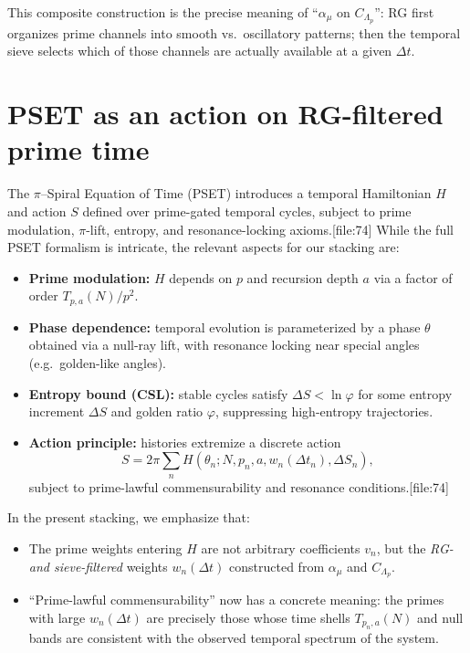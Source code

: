 \documentclass[11pt]{article}
\begin{document}
This composite construction is the precise meaning of ``$\alpha_\mu$ on $C_{\Lambda_p}$'': RG first organizes prime channels into smooth vs.\ oscillatory patterns; then the temporal sieve selects which of those channels are actually available at a given $\Delta t$.

\section{PSET as an action on RG-filtered prime time}

The $\pi$--Spiral Equation of Time (PSET) introduces a temporal Hamiltonian $H$ and action $S$ defined over prime-gated temporal cycles, subject to prime modulation, $\pi$-lift, entropy, and resonance-locking axioms.[file:74]
While the full PSET formalism is intricate, the relevant aspects for our stacking are:

\begin{itemize}
    \item \textbf{Prime modulation:} $H$ depends on $p$ and recursion depth $a$ via a factor of order $T_{p,a}(N) / p^2$.
    \item \textbf{Phase dependence:} temporal evolution is parameterized by a phase $\theta$ obtained via a null-ray lift, with resonance locking near special angles (e.g.\ golden-like angles).
    \item \textbf{Entropy bound (CSL):} stable cycles satisfy $\Delta S < \ln \varphi$ for some entropy increment $\Delta S$ and golden ratio $\varphi$, suppressing high-entropy trajectories.
    \item \textbf{Action principle:} histories extremize a discrete action
    \begin{equation}
        S = 2\pi \sum_n H(\theta_n; N, p_n, a, w_n(\Delta t_n), \Delta S_n),
    \end{equation}
    subject to prime-lawful commensurability and resonance conditions.[file:74]
\end{itemize}

In the present stacking, we emphasize that:
\begin{itemize}
    \item The prime weights entering $H$ are not arbitrary coefficients $v_n$, but the \emph{RG- and sieve-filtered} weights $w_n(\Delta t)$ constructed from $\alpha_\mu$ and $C_{\Lambda_p}$.
    \item ``Prime-lawful commensurability'' now has a concrete meaning: the primes with large $w_n(\Delta t)$ are precisely those whose time shells $T_{p_n,a}(N)$ and null bands are consistent with the observed temporal spectrum of the system.
\end{itemize}
\end{document}
